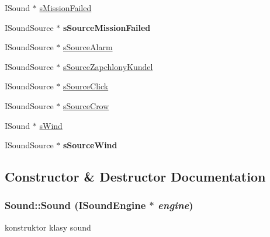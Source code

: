 \begin{DoxyCompactItemize}
\item 
ISound $\ast$ \hyperlink{class_sound_a75fa0bcfedb84fd8aadfaf5345aa2927}{sMissionFailed}
\item 
\hypertarget{class_sound_a68b5a292561b5d41a17dbcaa6770f740}{
ISoundSource $\ast$ {\bfseries sSourceMissionFailed}}
\label{class_sound_a68b5a292561b5d41a17dbcaa6770f740}

\item 
ISoundSource $\ast$ \hyperlink{class_sound_a0c689fbdc20fbe58c0b5f2669a818838}{sSourceAlarm}
\item 
ISoundSource $\ast$ \hyperlink{class_sound_ae251d500da7c338e7f95057b178857a4}{sSourceZapchlonyKundel}
\item 
ISoundSource $\ast$ \hyperlink{class_sound_ac300cf460eef51ef16f5d634193fd96e}{sSourceClick}
\item 
ISoundSource $\ast$ \hyperlink{class_sound_ac08242c25a195befdc4a349d1fc25746}{sSourceCrow}
\item 
ISound $\ast$ \hyperlink{class_sound_adc9fced45ebb6ce269c9b1b7df5d3714}{sWind}
\item 
\hypertarget{class_sound_a3cf96cedf01bf60161fe1ebc8d037eab}{
ISoundSource $\ast$ {\bfseries sSourceWind}}
\label{class_sound_a3cf96cedf01bf60161fe1ebc8d037eab}

\end{DoxyCompactItemize}


\subsection{Constructor \& Destructor Documentation}
\hypertarget{class_sound_a9f9260c6c6e41f13ee2f960f2968fd92}{
\subsubsection[{Sound}]{\setlength{\rightskip}{0pt plus 5cm}Sound::Sound (ISoundEngine $\ast$ {\em engine})}}
\label{class_sound_a9f9260c6c6e41f13ee2f960f2968fd92}
konstruktor klasy sound 

